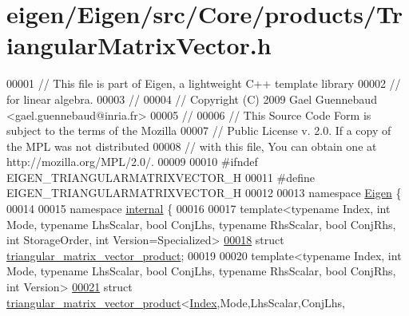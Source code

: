 \hypertarget{eigen_2_eigen_2src_2_core_2products_2_triangular_matrix_vector_8h_source}{}\section{eigen/\+Eigen/src/\+Core/products/\+Triangular\+Matrix\+Vector.h}
\label{eigen_2_eigen_2src_2_core_2products_2_triangular_matrix_vector_8h_source}

\begin{DoxyCode}
00001 \textcolor{comment}{// This file is part of Eigen, a lightweight C++ template library}
00002 \textcolor{comment}{// for linear algebra.}
00003 \textcolor{comment}{//}
00004 \textcolor{comment}{// Copyright (C) 2009 Gael Guennebaud <gael.guennebaud@inria.fr>}
00005 \textcolor{comment}{//}
00006 \textcolor{comment}{// This Source Code Form is subject to the terms of the Mozilla}
00007 \textcolor{comment}{// Public License v. 2.0. If a copy of the MPL was not distributed}
00008 \textcolor{comment}{// with this file, You can obtain one at http://mozilla.org/MPL/2.0/.}
00009 
00010 \textcolor{preprocessor}{#ifndef EIGEN\_TRIANGULARMATRIXVECTOR\_H}
00011 \textcolor{preprocessor}{#define EIGEN\_TRIANGULARMATRIXVECTOR\_H}
00012 
00013 \textcolor{keyword}{namespace }\hyperlink{namespace_eigen}{Eigen} \{
00014 
00015 \textcolor{keyword}{namespace }\hyperlink{namespaceinternal}{internal} \{
00016 
00017 \textcolor{keyword}{template}<\textcolor{keyword}{typename} Index, \textcolor{keywordtype}{int} Mode, \textcolor{keyword}{typename} LhsScalar, \textcolor{keywordtype}{bool} ConjLhs, \textcolor{keyword}{typename} RhsScalar, \textcolor{keywordtype}{bool} ConjRhs, \textcolor{keywordtype}{int} 
      StorageOrder, \textcolor{keywordtype}{int} Version=Specialized>
\hyperlink{struct_eigen_1_1internal_1_1triangular__matrix__vector__product}{00018} \textcolor{keyword}{struct }\hyperlink{struct_eigen_1_1internal_1_1triangular__matrix__vector__product}{triangular\_matrix\_vector\_product};
00019 
00020 \textcolor{keyword}{template}<\textcolor{keyword}{typename} Index, \textcolor{keywordtype}{int} Mode, \textcolor{keyword}{typename} LhsScalar, \textcolor{keywordtype}{bool} ConjLhs, \textcolor{keyword}{typename} RhsScalar, \textcolor{keywordtype}{bool} ConjRhs, \textcolor{keywordtype}{int} 
      Version>
\hyperlink{struct_eigen_1_1internal_1_1triangular__matrix__vector__product_3_01_index_00_01_mode_00_01_lhs_ba3c1ba3cb379196807b17d99fce4e08}{00021} \textcolor{keyword}{struct }\hyperlink{struct_eigen_1_1internal_1_1triangular__matrix__vector__product}{triangular\_matrix\_vector\_product}<\hyperlink{namespace_eigen_a62e77e0933482dafde8fe197d9a2cfde}{Index},Mode,LhsScalar,ConjLhs,

\end{DoxyCode}
